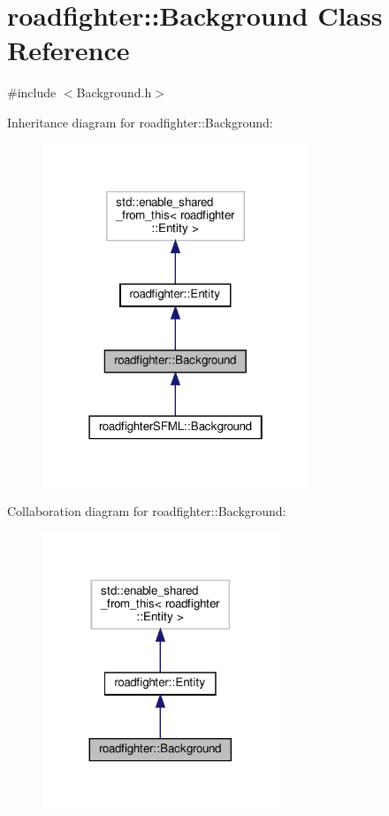 \hypertarget{classroadfighter_1_1Background}{}\section{roadfighter\+:\+:Background Class Reference}
\label{classroadfighter_1_1Background}


{\ttfamily \#include $<$Background.\+h$>$}



Inheritance diagram for roadfighter\+:\+:Background\+:\nopagebreak
\begin{figure}[H]
\begin{center}
\leavevmode
\includegraphics[width=226pt]{classroadfighter_1_1Background__inherit__graph}
\end{center}
\end{figure}


Collaboration diagram for roadfighter\+:\+:Background\+:\nopagebreak
\begin{figure}[H]
\begin{center}
\leavevmode
\includegraphics[width=200pt]{classroadfighter_1_1Background__coll__graph}
\end{center}
\end{figure}
